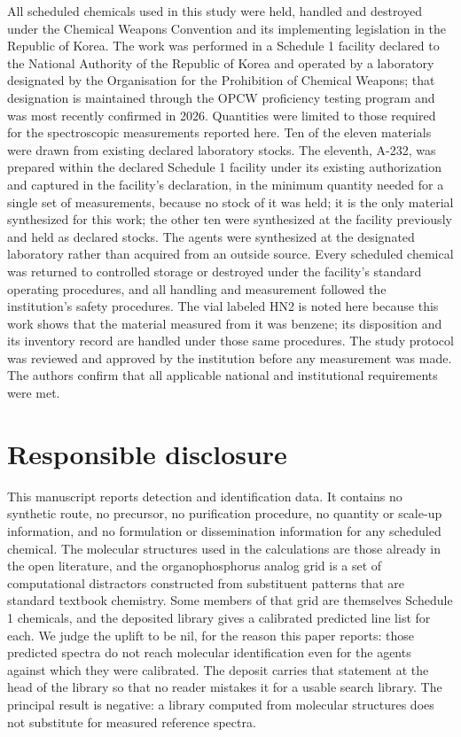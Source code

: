 \documentclass[review,12pt]{elsarticle}
\begin{document}
All scheduled chemicals used in this study were held, handled and destroyed under the
Chemical Weapons Convention and its implementing legislation in the Republic of Korea.
The work was performed in a Schedule 1 facility declared to the National Authority of the
Republic of Korea and operated by a laboratory designated by the Organisation for the
Prohibition of Chemical Weapons; that designation is maintained through the OPCW
proficiency testing program and was most recently confirmed in 2026. Quantities were limited to those required for the
spectroscopic measurements reported here. Ten of the eleven materials were drawn from
existing declared laboratory stocks. The eleventh, A-232, was prepared within the declared
Schedule 1 facility under its existing authorization and captured in the facility's
declaration, in the minimum quantity needed for a single set of measurements, because no
stock of it was held; it is the only material synthesized for this work; the other ten were synthesized at the facility previously and held as declared stocks. The agents were
synthesized at the designated laboratory rather than acquired from an outside source.
Every scheduled chemical was returned to controlled storage or destroyed under the
facility's standard operating procedures, and all handling and measurement followed the
institution's safety procedures. The vial labeled HN2 is noted here because this work
shows that the material measured from it was benzene; its disposition and its inventory
record are handled under those same procedures. The study protocol was reviewed and approved by the institution
before any measurement was made. The authors confirm that all applicable national and
institutional requirements were met.

\section*{Responsible disclosure}

This manuscript reports detection and identification data. It contains no synthetic
route, no precursor, no purification procedure, no quantity or scale-up information, and
no formulation or dissemination information for any scheduled chemical. The molecular
structures used in the calculations are those already in the open literature, and the
organophosphorus analog grid is a set of computational distractors constructed from
substituent patterns that are standard textbook chemistry. Some members of that grid are
themselves Schedule 1 chemicals, and the deposited library gives a calibrated predicted
line list for each. We judge the uplift to be nil, for the reason this paper reports: those
predicted spectra do not reach molecular identification even for the agents against which
they were calibrated. The deposit carries that statement at the head of the library so that
no reader mistakes it for a usable search library. The principal result is
negative: a library computed from molecular structures does not substitute for measured
reference spectra.
\end{document}
